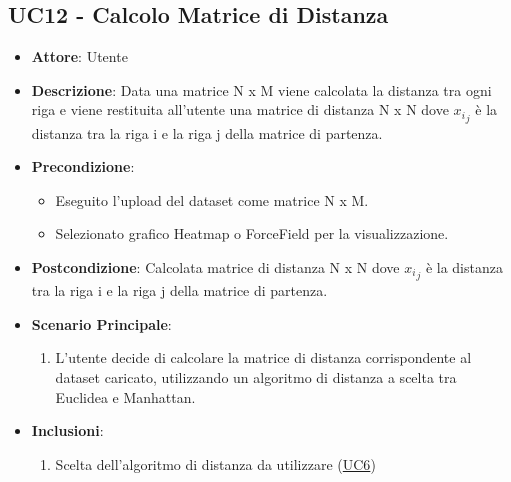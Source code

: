     \subsection{UC12 - Calcolo Matrice di Distanza}
    \begin{itemize}
    \item \textbf{Attore}: Utente
    \item \textbf{Descrizione}: Data una matrice N x M viene calcolata la distanza tra ogni riga e viene restituita all'utente una matrice di distanza N x N dove \({x_i}_j\) è la distanza tra la riga i e la riga j della matrice di partenza.
    \item \textbf{Precondizione}: 
    \begin{itemize}
        \item Eseguito l'upload del dataset come matrice N x M.
        \item Selezionato grafico Heatmap o ForceField per la visualizzazione.
    \end{itemize}  
    \item \textbf{Postcondizione}: Calcolata matrice di distanza N x N dove \({x_i}_j\) è la distanza tra la riga i e la riga j della matrice di partenza.
    \item \textbf{Scenario Principale}: 
    \begin{enumerate}
        \item L'utente decide di calcolare la matrice di distanza corrispondente al dataset caricato, utilizzando un algoritmo di distanza a scelta tra Euclidea e Manhattan.
    \end{enumerate}  
    \item \textbf{Inclusioni}:
        \begin{enumerate}
                \begin{enumerate}
                    \item Scelta dell'algoritmo di distanza da utilizzare (\hyperref[uc6]{UC6})
                \end{enumerate}
        \end{enumerate} 
    \end{itemize}
    
  
    
    
    
    
    
    
    
    